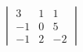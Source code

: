 \documentclass{article}%
\begin{document}
%
\pagestyle{empty}%
\LARGE%
$\begin{vmatrix}3 & 1 & 1 \\ -1 & 0 & 5 \\ -1 & 2 & -2 \end{vmatrix}$%
\end{document}
